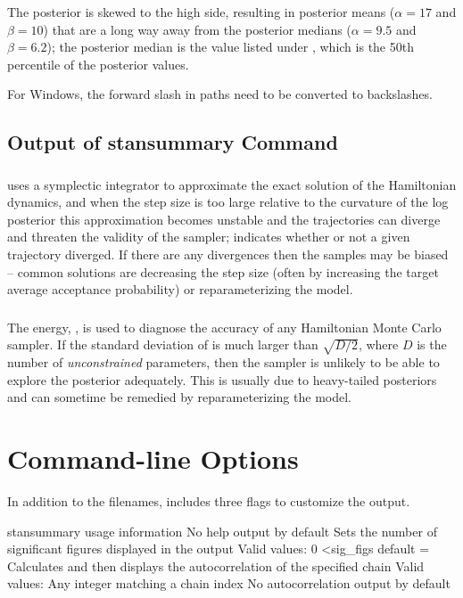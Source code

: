 %
The posterior is skewed to the high side, resulting in posterior means
($\alpha=17$ and $\beta=10$) that are a long way away from the posterior
medians ($\alpha=9.5$ and $\beta=6.2$);  the posterior median is the
value listed under , which is the 50th percentile of the
posterior values.

For Windows, the forward slash in paths need to be converted to backslashes.


\subsection{Output of stansummary Command}

\subsubsection{}

\CmdStan uses a symplectic integrator to approximate the exact
solution of the Hamiltonian dynamics, and when the step size is too
large relative to the curvature of the log posterior this
approximation becomes unstable and the trajectories can diverge and
threaten the validity of the sampler;  indicates whether
or not a given trajectory diverged.  If there are any divergences then 
the samples may be biased -- common solutions are decreasing the
step size (often by increasing the target average acceptance probability)
or reparameterizing the model.

\subsubsection{}

The energy, , is used to diagnose the accuracy of any Hamiltonian
Monte Carlo sampler.  If the standard deviation of  is much larger
than $\sqrt{D / 2}$, where $D$ is the number of \emph{unconstrained}
parameters, then the sampler is unlikely to be able to explore the
posterior adequately.  This is usually due to heavy-tailed posteriors and
can sometime be remedied by reparameterizing the model.

\section{Command-line Options}

In addition to the filenames,  includes three flags to
customize the output.

\begin{description}
 {stansummary usage information} {No help output by default}
%
{Sets the number of significant figures displayed in the output}
{Valid values: 0 \textless sig\_figs}
{default =  }
%
{Calculates and then displays the autocorrelation of the specified chain}
{Valid values: Any integer matching a chain index}
{No autocorrelation output by default}
%
\end{description}
